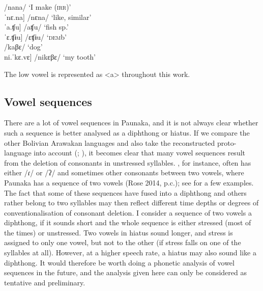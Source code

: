 	
\ea\label{ex:a-e}
\ea 	\tab[ˈna.na] \tab /nana/ \tab ‘I make (\textsc{irr})’\\
 	\tab{[}ˈnɛ.na] \tab /nɛna/ \tab ‘like, similar’\\
\ex 	\tab{[}ˈa.ʧu] \tab /aʧu/ \tab\tab ‘fish sp.’\\
 	\tab{[}ˈɛ.ʧɨu] \tab /ɛʧɨu/ \tab\tab ‘\textsc{dem}b’\\
\ex 	\tab[ˈka.vɛ] \tab /kaβɛ/ \tab ‘dog’\\
 	\tab{[}ni.ˈkɛ.vɛ] \tab /nikɛβɛ/ \tab ‘my tooth’\\%
\z
\xe	
    
The low vowel is represented as <a> throughout this work.
    
\subsection{Vowel sequences} \label{Diphthongs}
There are a lot of vowel sequences in Paunaka, and it is not always clear whether such a sequence is better analysed as a diphthong or hiatus. If we compare the other Bolivian Arawakan languages and also take the reconstructed proto-lan\-guage into account (\citealt[cf.][]{deCarvalhoPAU}; \citealt[]{RamirezFranca2019}), it becomes clear that many vowel sequences result from the deletion of consonants in unstressed syllables. , for instance, often has either /ɾ/ or /ʔ/ and sometimes other consonants between two vowels, where Paunaka has a sequence of two vowels (Rose 2014, p.c.); see  for a few examples. The fact that some of these sequences have fused into a diphthong and others rather belong to two syllables may then reflect different time depths or degrees of conventionalisation of consonant deletion. I consider a sequence of two vowels a diphthong, if it sounds short and the whole sequence is either stressed (most of the times) or unstressed. Two vowels in hiatus sound longer, and stress is assigned to only one vowel, but not to the other (if stress falls on one of the syllables at all). However, at a higher speech rate, a hiatus may also sound like a diphthong. It would therefore be worth doing a phonetic analysis of vowel sequences in the future, and the analysis given here can only be considered as tentative and preliminary.

